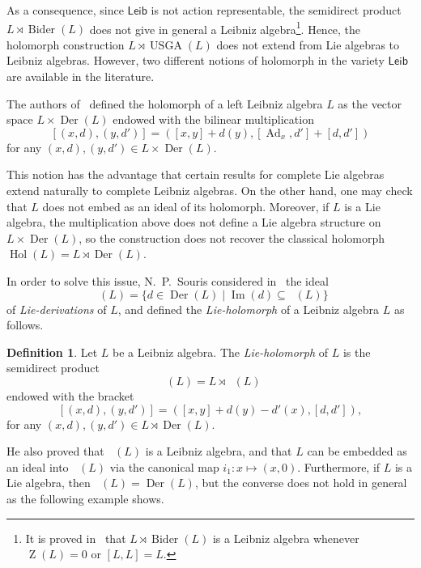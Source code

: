 \documentclass[11pt,a4paper]{amsart}
\theoremstyle{plain}
\theoremstyle{definition}
\newtheorem{definition}[subsection]{Definition}
\theoremstyle{remark}
\numberwithin{equation}{section}
\newcommand{\0}{\emptyset}
\DeclareMathOperator{\Imm}{Im}
\DeclareMathOperator{\Der}{Der}
\DeclareMathOperator{\DerL}{Der_{Lie}}
\DeclareMathOperator{\Bider}{Bider}
\DeclareMathOperator{\Ad}{Ad}
\DeclareMathOperator{\Z}{Z}
\DeclareMathOperator{\ZL}{Z_{Lie}}
\DeclareMathOperator{\hol}{Hol}
\DeclareMathOperator{\holL}{hol_{Lie}}
\DeclareMathOperator{\USGA}{USGA}
\newcommand{\sLeib}{\ensuremath{\mathsf{Leib}}}
\begin{document}
As a consequence, since $\sLeib$ is not action representable, the semidirect product $L \rtimes \Bider(L)$ does not  give in general a Leibniz algebra\footnote{It is proved in~\cite[Section 5]{casas} that $L \rtimes \Bider(L)$ is a Leibniz algebra whenever $\Z(L)=0$ or $[L,L]=L$.}. Hence, the holomorph construction $L \rtimes \USGA(L)$ does not extend from Lie algebras to Leibniz algebras. However, two different notions of holomorph in the variety $\sLeib$ are available in the literature.

The authors of~\cite{misra} defined the holomorph of a left Leibniz algebra $L$ as the vector space $L \times \Der(L)$ endowed with the bilinear multiplication
\[
[(x,d),(y,d')]=([x,y]+d(y),[\Ad_x,d']+[d,d'])
\]
for any $(x,d),(y,d') \in L \times \Der(L)$.

This notion has the advantage that certain results for complete Lie algebras extend naturally to complete Leibniz algebras. On the other hand, one may check that $L$ does not embed as an ideal of its holomorph. Moreover, if $L$ is a Lie algebra, the multiplication above does not define a Lie algebra structure on $L \times \Der(L)$, so the construction does not recover the classical holomorph $\hol(L)=L \rtimes \Der(L)$.

In order to solve this issue, N.~P.~Souris considered in~\cite{souris} the ideal
\[
\DerL(L)=\lbrace d \in \Der(L) \mid \Imm(d) \subseteq \ZL(L) \rbrace
\]
of \emph{Lie-derivations} of $L$, and defined the \emph{Lie-holomorph} of a Leibniz algebra $L$ as follows.

\begin{definition}\cite{souris}
Let $L$ be a Leibniz algebra. The \emph{Lie-holomorph} of $L$ is the semidirect product
\[
\holL(L)=L \rtimes \DerL(L)
\]
endowed with the bracket
\[
[(x,d),(y,d')]=([x,y]+d(y)-d'(x),[d,d']),
\]
for any $(x,d),(y,d') \in L \rtimes \Der(L)$.
\end{definition}

He also proved that $\holL(L)$ is a Leibniz algebra, and that $L$ can be embedded as an ideal into $\holL(L)$ via the canonical map $i_1 \colon x \mapsto (x,0)$. Furthermore, if $L$ is a Lie algebra, then $\DerL(L)=\Der(L)$, but the converse does not hold in general as the following example shows.
\end{document}
